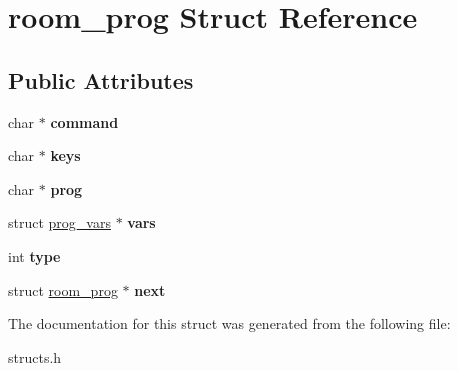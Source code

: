 \hypertarget{structroom__prog}{\section{room\-\_\-prog Struct Reference}
\label{structroom__prog}
}
\subsection*{Public Attributes}
\begin{DoxyCompactItemize}
\item 
\hypertarget{structroom__prog_a785c039ae10bd7e7fdac5c9b8a048cd1}{char $\ast$ {\bfseries command}}\label{structroom__prog_a785c039ae10bd7e7fdac5c9b8a048cd1}

\item 
\hypertarget{structroom__prog_a97a2bb1c30f4b7f1af4d5dd3aac64693}{char $\ast$ {\bfseries keys}}\label{structroom__prog_a97a2bb1c30f4b7f1af4d5dd3aac64693}

\item 
\hypertarget{structroom__prog_a879dff7e316425c48fee99392d5c06f5}{char $\ast$ {\bfseries prog}}\label{structroom__prog_a879dff7e316425c48fee99392d5c06f5}

\item 
\hypertarget{structroom__prog_a3f846626322a515475608f1b328b1528}{struct \hyperlink{structprog__vars}{prog\-\_\-vars} $\ast$ {\bfseries vars}}\label{structroom__prog_a3f846626322a515475608f1b328b1528}

\item 
\hypertarget{structroom__prog_ad84ce03878d550aa9d2d5beb81871e04}{int {\bfseries type}}\label{structroom__prog_ad84ce03878d550aa9d2d5beb81871e04}

\item 
\hypertarget{structroom__prog_afa84c0c83a57a395e7d7bb1645741f6c}{struct \hyperlink{structroom__prog}{room\-\_\-prog} $\ast$ {\bfseries next}}\label{structroom__prog_afa84c0c83a57a395e7d7bb1645741f6c}

\end{DoxyCompactItemize}


The documentation for this struct was generated from the following file\-:\begin{DoxyCompactItemize}
\item 
structs.\-h\end{DoxyCompactItemize}

